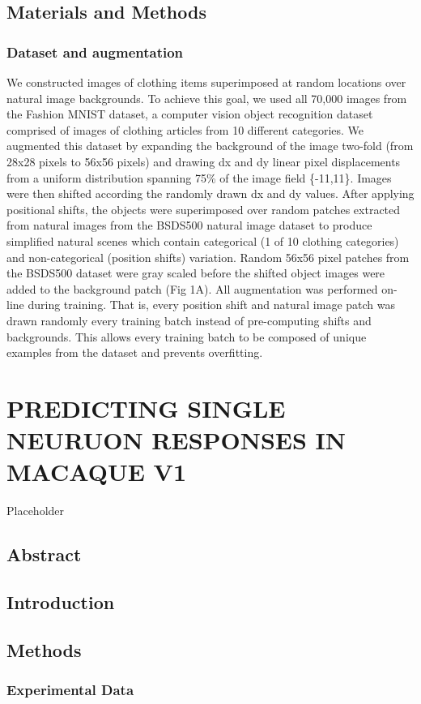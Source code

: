 \documentclass{templates/ucdenverthesis}
\begin{document}
\hypertarget{materials-and-methods}{%
\section{Materials and Methods}\label{materials-and-methods}}

\hypertarget{dataset-and-augmentation}{%
\subsection{Dataset and augmentation}\label{dataset-and-augmentation}}

We constructed images of clothing items superimposed at random locations over natural image backgrounds. To achieve this goal, we used all 70,000 images from the Fashion MNIST dataset, a computer vision object recognition dataset comprised of images of clothing articles from 10 different categories. We augmented this dataset by expanding the background of the image two-fold (from 28x28 pixels to 56x56 pixels) and drawing dx and dy linear pixel displacements from a uniform distribution spanning 75\% of the image field \{-11,11\}. Images were then shifted according the randomly drawn dx and dy values. After applying positional shifts, the objects were superimposed over random patches extracted from natural images from the BSDS500 natural image dataset to produce simplified natural scenes which contain categorical (1 of 10 clothing categories) and non-categorical (position shifts) variation. Random 56x56 pixel patches from the BSDS500 dataset were gray scaled before the shifted object images were added to the background patch (Fig 1A). All augmentation was performed on-line during training. That is, every position shift and natural image patch was drawn randomly every training batch instead of pre-computing shifts and backgrounds. This allows every training batch to be composed of unique examples from the dataset and prevents overfitting.

\hypertarget{ch5:jov}{%
\chapter{PREDICTING SINGLE NEURUON RESPONSES IN MACAQUE V1}\label{ch5:jov}}

Placeholder

\hypertarget{abstract-2}{%
\section*{Abstract}\label{abstract-2}}

\hypertarget{introduction}{%
\section{Introduction}\label{introduction}}

\hypertarget{methods}{%
\section{Methods}\label{methods}}

\hypertarget{experimental-data}{%
\subsection{Experimental Data}\label{experimental-data}}

\printbibliography[heading=bibintoc]
\end{document}

